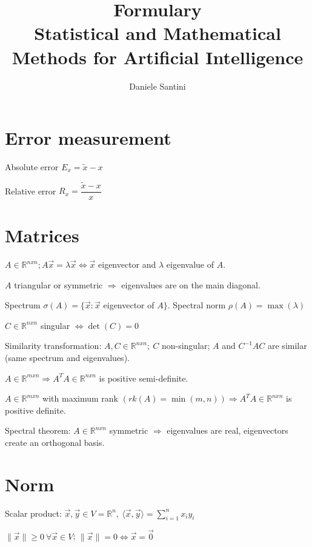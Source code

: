 \documentclass[]{article}
\title{Formulary \\ \large Statistical and Mathematical Methods for Artificial Intelligence}
\author{Daniele Santini}
\begin{document}
	
	
	\section{Error measurement}
	
	Absolute error $E_x = \tilde{x} - x$
	
	Relative error $R_x = \dfrac{\tilde{x} - x}{x}$
	
	\section{Matrices}
	
	$A \in \mathbb{R}^{nxn}; A \vec{x} = \lambda \vec{x} \Leftrightarrow \vec{x}$ eigenvector and $\lambda$ eigenvalue of $A$.
	
	$A$ triangular or symmetric $\Rightarrow$ eigenvalues are on the main diagonal.
	
	Spectrum $\sigma(A) = \{\vec{x}: \vec{x}$ eigenvector of $A\}$.
	Spectral norm $\rho(A) = \max(\lambda)$
	
	$C \in \mathbb{R}^{nxn}$ singular $\Leftrightarrow \det(C)=0$
	
	Similarity transformation: $A, C \in \mathbb{R}^{nxn}; \ C$ non-singular; $A$ and $C^{-1} A C$ are similar (same spectrum and eigenvalues).
	
	
	
	
	
	
	$A \in \mathbb{R}^{mxn} \Rightarrow A^T A \in \mathbb{R}^{nxn}$ is positive semi-definite.
	
	$A \in \mathbb{R}^{mxn}$ with maximum rank $(rk(A)=\min(m,n)) \Rightarrow A^T A \in \mathbb{R}^{nxn}$ is positive definite.
	
	Spectral theorem: $A \in \mathbb{R}^{nxn}$ symmetric $\Rightarrow$ eigenvalues are real, eigenvectors create an orthogonal basis.
	
	\section{Norm}
	
	Scalar product: $\vec{x},\vec{y} \in V=\mathbb{R}^n, \ \langle \vec{x},\vec{y} \rangle = \sum\limits_{i=1}^{n} x_i y_i$
	
	$\lVert \vec{x} \rVert \ge 0 \ \forall \vec{x} \in V$;
	$\lVert \vec{x} \rVert=0 \iff \vec{x}=\vec{0}$
	
\end{document}
